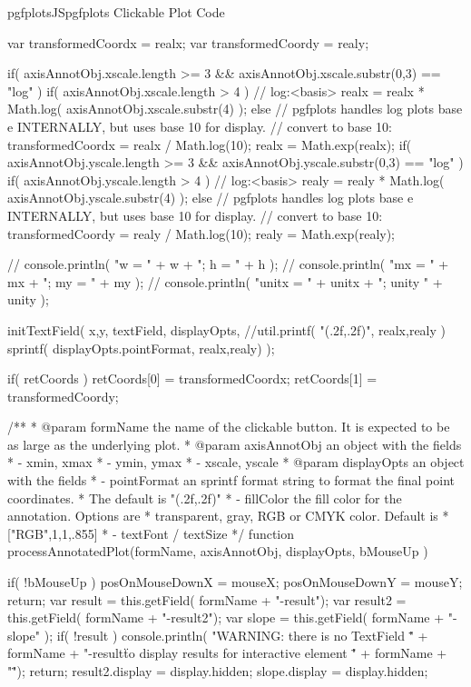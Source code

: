 {{\begin{insDLJS}[processAnnotatedPlot]{pgfplotsJS}{pgfplots Clickable Plot Code}
{	var transformedCoordx = realx;
	var transformedCoordy = realy;

	if( axisAnnotObj.xscale.length >= 3 && axisAnnotObj.xscale.substr(0,3) == "log" ) {
		if( axisAnnotObj.xscale.length > 4 ) // log:<basis>
			realx = realx * Math.log( axisAnnotObj.xscale.substr(4) );
		else {
			// pgfplots handles log plots base e INTERNALLY, but uses base 10 for display.
			// convert to base 10:
			transformedCoordx = realx / Math.log(10);
		}
		realx = Math.exp(realx);
	}
	if( axisAnnotObj.yscale.length >= 3 && axisAnnotObj.yscale.substr(0,3) == "log" ) {
		if( axisAnnotObj.yscale.length > 4 ) // log:<basis>
			realy = realy * Math.log( axisAnnotObj.yscale.substr(4) );
		else {
			// pgfplots handles log plots base e INTERNALLY, but uses base 10 for display.
			// convert to base 10:
			transformedCoordy = realy / Math.log(10);
		}
		realy = Math.exp(realy);
	}

//	console.println( "w = " + w + "; h = " + h );
//	console.println( "mx = " + mx + "; my = " + my );
//	console.println( "unitx = " + unitx + "; unity " + unity );

	initTextField( x,y, textField, displayOpts,
		//util.printf( "(\pgfplotsPERCENT.2f,\pgfplotsPERCENT.2f)", realx,realy )
		sprintf( displayOpts.pointFormat, realx,realy) );

	if( retCoords ) {
		retCoords[0] = transformedCoordx;
		retCoords[1] = transformedCoordy;
	}

}

/**
 * @param formName the name of the clickable button. It is expected to be as large as the underlying plot.
 * @param axisAnnotObj an object with the fields
 *   - xmin, xmax
 *   - ymin, ymax
 *   - xscale, yscale
 * @param displayOpts an object with the fields
 *   - pointFormat an sprintf format string to format the final point coordinates.
 *   The default is  "(\pgfplotsPERCENT.2f,\pgfplotsPERCENT.2f)"
 *   - fillColor the fill color for the annotation. Options are
 *    transparent, gray, RGB or CMYK color. Default is
 *       ["RGB",1,1,.855]
 *	 - textFont / textSize
 */
function processAnnotatedPlot(formName, axisAnnotObj, displayOpts, bMouseUp ) 
{
	if( !bMouseUp ) {
		posOnMouseDownX = mouseX;
		posOnMouseDownY = mouseY;
		return;
	}
	var result = this.getField( formName + "-result");
	var result2 = this.getField( formName + "-result2");
	var slope 	= this.getField( formName + "-slope" );
	if( !result ) {
		console.println( "WARNING: there is no TextField \"" + formName + "-result\" to display results for interactive element \"" + formName + "\"");
		return;
	}
	result2.display = display.hidden;
	slope.display = display.hidden;

}
\end{insDLJS}}}
